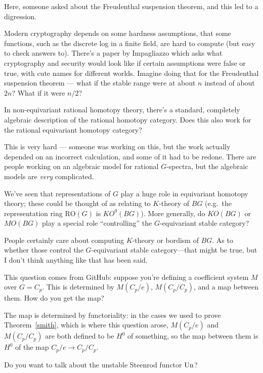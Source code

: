 Here, someone asked about the Freudenthal suspension theorem, and this led to a digression.
\begin{rem}
Modern cryptography depends on some hardness assumptions, that some functions, such as the discrete log in a finite
field, are hard to compute (but easy to check answers to). There's a paper by Impagliazzo which asks what
cryptography and security would look like if certain assumptions were false or true, with cute names for different
worlds. Imagine doing that for the Freudenthal suspension theorem --- what if the stable range were at about $n$
instead of about $2n$? What if it were $n/2$?
\end{rem}
\begin{ques}
In non-equivariant rational homotopy theory, there's a standard, completely algebraic description of the rational
homotopy category. Does this also work for the rational equivariant homotopy category?
\end{ques}
This is very hard --- someone was working on this, but the work actually depended on an incorrect calculation, and
some of it had to be redone. There are people working on an algebraic model for rational $G$-spectra, but the
algebraic models are \emph{very} complicated.
\begin{ques}
We've seen that representations of $G$ play a huge role in equivariant homotopy theory; these could be thought of
as relating to $K$-theory of $BG$ (e.g.\ the representation ring $\mathrm{RO}(G)$ is $KO^0(BG)$). More generally,
do $\mathit{KO}(BG)$ or $\mathit{MO}(BG)$ play a special role ``controlling'' the $G$-equivariant stable category?
\end{ques}
People certainly care about computing $K$-theory or bordism of $BG$. As to whether those control the $G$-equivariant stable category---that might be true, but I don't think anything like that has been said.
\begin{ques}
This question comes from GitHub: suppose you're defining a coefficient system $M$ over $G = C_p$. This is
determined by $M(C_p/e)$, $M(C_p/C_p)$, and a map between them. How do you get the map?
\end{ques}
The map is determined by functoriality: in the cases we used to prove Theorem~\ref{smith}, which is where this
question arose, $M(C_p/e)$ and $M(C_p/C_p)$ are both defined to be $H^0$ of something, so the map between them is
$H^0$ of the map $C_p/e\to C_p/C_p$.
\begin{ques}
Do you want to talk about the unstable Steenrod functor $\operatorname{Un}$?
\end{ques}

